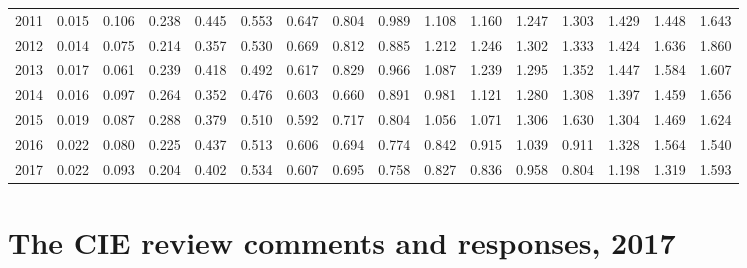 \documentclass[]{article}
\begin{document}
\begin{table}[ht]
\begin{tabular}{crrrrrrrrrrrrrrr}
2011 & 0.015 & 0.106 & 0.238 & 0.445 & 0.553 & 0.647 & 0.804 & 0.989 & 1.108 & 1.160 & 1.247 & 1.303 & 1.429 & 1.448 & 1.643 \\
2012 & 0.014 & 0.075 & 0.214 & 0.357 & 0.530 & 0.669 & 0.812 & 0.885 & 1.212 & 1.246 & 1.302 & 1.333 & 1.424 & 1.636 & 1.860 \\
2013 & 0.017 & 0.061 & 0.239 & 0.418 & 0.492 & 0.617 & 0.829 & 0.966 & 1.087 & 1.239 & 1.295 & 1.352 & 1.447 & 1.584 & 1.607 \\
2014 & 0.016 & 0.097 & 0.264 & 0.352 & 0.476 & 0.603 & 0.660 & 0.891 & 0.981 & 1.121 & 1.280 & 1.308 & 1.397 & 1.459 & 1.656 \\
2015 & 0.019 & 0.087 & 0.288 & 0.379 & 0.510 & 0.592 & 0.717 & 0.804 & 1.056 & 1.071 & 1.306 & 1.630 & 1.304 & 1.469 & 1.624 \\
2016 & 0.022 & 0.080 & 0.225 & 0.437 & 0.513 & 0.606 & 0.694 & 0.774 & 0.842 & 0.915 & 1.039 & 0.911 & 1.328 & 1.564 & 1.540 \\
2017 & 0.022 & 0.093 & 0.204 & 0.402 & 0.534 & 0.607 & 0.695 & 0.758 & 0.827 & 0.836 & 0.958 & 0.804 & 1.198 & 1.319 & 1.593 \\
\hline
\end{tabular}
\end{table}

\clearpage

\section{The CIE review comments and responses,
2017}\label{the-cie-review-comments-and-responses-2017}
\end{document}
